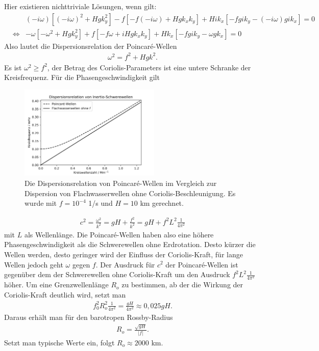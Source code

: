 \documentclass{book}
\begin{document}
%
Hier existieren nichttriviale Lösungen, wenn gilt:
%
\begin{eqnarray}
&&\left(-i\omega\right)\left[\left(-i\omega\right)^2 + Hgk_y^2\right] - f\left[-f\left(-i\omega\right) + Hgk_xk_y\right] + Hik_x\left[-fgik_y - \left(-i\omega\right)gik_x\right] = 0\nonumber\\
&\Leftrightarrow& -\omega\left[-\omega^2 + Hgk_y^2\right] + f\left[-f\omega + iHgk_xk_y\right] + Hk_x\left[-fgik_y - \omega gk_x\right] = 0
\end{eqnarray}
%
Also lautet die Dispersionsrelation der Poincaré-Wellen
%
\begin{eqnarray}
\omega^2 = f^2 + Hgk^2.\label{eq:poincare_dispersion}
\end{eqnarray}
%
Es ist $\omega^2\geq f^2$, der Betrag des Coriolis-Parameters ist eine untere Schranke der Kreisfrequenz. Für die Phasengeschwindigkeit gilt

\begin{figure}
\begin{center}
\includegraphics[width = 0.6\textwidth]{figs/inertio_gravity_dispersion.png}
\caption{Die Dispersionsrelation von Poincaré-Wellen im Vergleich zur Dispersion von Flachwasserwellen ohne Coriolis-Beschleunigung. Es wurde mit $f = 10^{-4}$ 1/s und $H = 10$ km gerechnet.}
\label{fig:poincare_dispersion}
\end{center}
\end{figure}
%
\begin{eqnarray}
c^2 = \frac{\omega^2}{k^2} = gH + \frac{f^2}{k^2} = gH + f^2L^2\frac{1}{4\pi^2}
\end{eqnarray}
%
mit $L$ als Wellenlänge. Die Poincaré-Wellen haben also eine höhere Phasengeschwindigkeit als die Schwerewellen ohne Erdrotation. Desto kürzer die Wellen werden, desto geringer wird der Einfluss der Coriolis-Kraft, für lange Wellen jedoch geht $\omega$ gegen $f$. Der Ausdruck für $c^2$ der Poincaré-Wellen ist gegenüber dem der Schwerewellen ohne Coriolis-Kraft um den Ausdruck $f^2L^2\frac{1}{4\pi^2}$ höher. Um eine Grenzwellenlänge $R_o$ zu bestimmen, ab der die Wirkung der Coriolis-Kraft deutlich wird, setzt man
%
\begin{eqnarray}
f_0^2R_o^2\frac{1}{4\pi^2} = \frac{gH}{4\pi^2}\approx 0, 025gH.
\end{eqnarray}
%
Daraus erhält man für den barotropen Rossby-Radius
%
\begin{eqnarray}
R_o = \frac{\sqrt{gH}}{\left|f\right|}.\label{eq:def_baro_ro_r}
\end{eqnarray}
%
Setzt man typische Werte ein, folgt $R_o \approx2000$ km.
\end{document}

